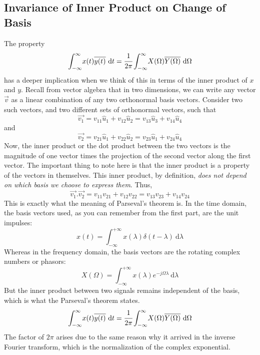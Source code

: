 \subsection{Invariance of Inner Product on Change of Basis}
	The property
	\begin{equation*}
		\int_{-\infty}^{\infty} \! x(t)\overline{y(t)} \ \dm t = \cfrac{1}{2\pi}\int_{-\infty}^{\infty} \! X(\Omega)\overline{Y(\Omega)} \ \dm \Omega
	\end{equation*}
	has a deeper implication when we think of this in terms of the inner product of $x$ and $y$. Recall from vector algebra that in two dimensions, we can write any vector $\overrightarrow{v}$ as a linear combination of any two orthonormal basis vectors. Consider two such vectors, and two different sets of orthonormal vectors, such that
	\begin{equation*}
		\overrightarrow{v_1}=v_{11}\hat{u}_1+v_{12}\hat{u}_2 = v_{13}\hat{u}_3+v_{14}\hat{u}_4
	\end{equation*}
	and
	\begin{equation*}
		\overrightarrow{v_2}=v_{21}\hat{u}_1+v_{22}\hat{u}_2 = v_{23}\hat{u}_1+v_{24}\hat{u}_4
	\end{equation*}
	Now, the inner product or the dot product between the two vectors is the magnitude of one vector times the projection of the second vector along the first vector. The important thing to note here is that the inner product is a property of the vectors in themselves. This inner product, by definition, \emph{does not depend on which basis we choose to express them}. Thus,
	\begin{equation*}
		\overrightarrow{v_1}.\overrightarrow{v_2}=v_{11}v_{21}+v_{12}v_{22} = v_{13}v_{23}+v_{14}v_{24}
	\end{equation*}
	This is exactly what the meaning of Parseval's theorem is. In the time domain, the basis vectors used, as you can remember from the first part, are the unit impulses:
	\begin{equation*}
		x(t) = \int_{-\infty}^{+\infty} \! x(\lambda)\delta(t-\lambda) \ \mathrm{d}\lambda
	\end{equation*}
	Whereas in the frequency domain, the basis vectors are the rotating complex numbers or phasors:
	\begin{equation*}
		X(\Omega) = \int_{-\infty}^{+\infty} \! x(\lambda)e^{-j\Omega\lambda} \ \mathrm{d}\lambda
	\end{equation*}
	But the inner product between two signals remains independent of the basis, which is what the Parseval's theorem states.
	\begin{equation*}
		\int_{-\infty}^{\infty} \! x(t)\overline{y(t)} \ \dm t = \cfrac{1}{2\pi}\int_{-\infty}^{\infty} \! X(\Omega)\overline{Y(\Omega)} \ \dm \Omega
	\end{equation*}
	The factor of $2\pi$ arises due to the same reason why it arrived in the inverse Fourier transform, which is the normalization of the complex exponential.
